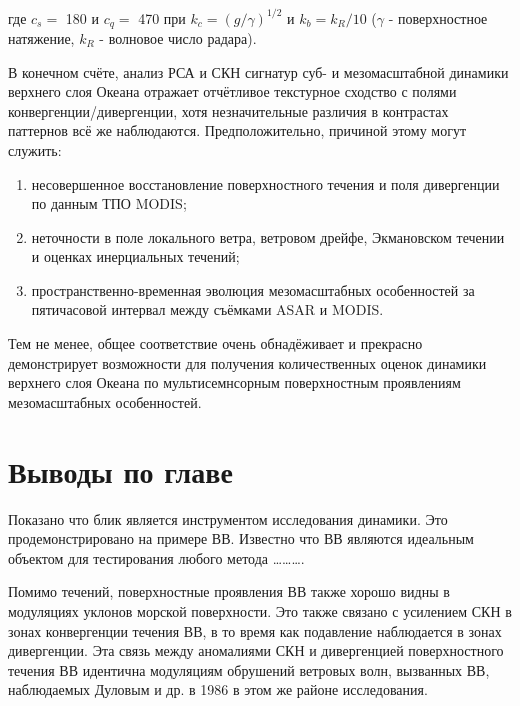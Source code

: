 \noindent где $c_{s} =$ 180 и $c_{q} =$ 470 при $k_{c} =(g/\gamma )^{1/2} $ и $k_{b} =k_{R} /10$ ($\gamma $ - поверхностное натяжение, $k_{R} $ - волновое число радара).

В конечном счёте, анализ РСА и СКН сигнатур суб- и мезомасштабной динамики верхнего слоя Океана отражает отчётливое текстурное сходство с полями конвергенции/дивергенции, хотя незначительные различия в контрастах паттернов всё же наблюдаются. Предположительно, причиной этому могут служить:

\begin{enumerate}
\item  несовершенное восстановление поверхностного течения и поля дивергенции по данным ТПО MODIS;

\item  неточности в поле локального ветра, ветровом дрейфе, Экмановском течении и оценках инерциальных течений;

\item  пространственно-временная эволюция мезомасштабных особенностей за пятичасовой интервал между съёмками ASAR и MODIS.
\end{enumerate}

Тем не менее, общее соответствие очень обнадёживает и прекрасно демонстрирует возможности для получения количественных оценок динамики верхнего слоя Океана по мультисемнсорным поверхностным проявлениям мезомасштабных особенностей.



\newpage


\section{Выводы по главе} \label{sec:3.4}


Показано что блик является инструментом исследования динамики. Это продемонстрировано на примере ВВ. Известно что ВВ являются идеальным объектом для тестирования любого метода \dots \dots \dots .

Помимо течений, поверхностные проявления ВВ также хорошо видны в модуляциях уклонов морской поверхности. Это также связано с усилением СКН в зонах конвергенции течения ВВ, в то время как подавление наблюдается в зонах дивергенции. Эта связь между аномалиями СКН и дивергенцией поверхностного течения ВВ идентична модуляциям обрушений ветровых волн, вызванных ВВ, наблюдаемых Дуловым и др. в 1986 \citep{1986} в этом же районе исследования.



